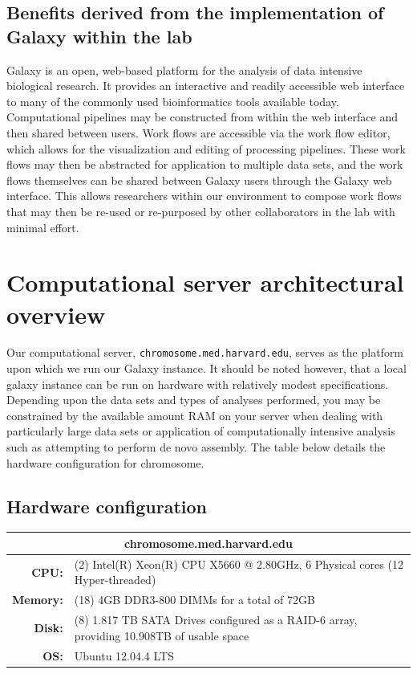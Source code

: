 \documentclass[a4paper,10pt]{article}
\begin{document}
\subsection{Benefits derived from the implementation of Galaxy within the lab}
Galaxy is an open, web-based platform for the analysis of data intensive biological research.  It provides an interactive and readily accessible web interface to many of the commonly used bioinformatics tools available today.  Computational pipelines may be constructed from within the web interface and then shared between users.  Work flows are accessible via the work flow editor, which allows for the visualization and editing of processing pipelines.  These work flows may then be abstracted for application to multiple data sets, and the work flows themselves can be shared between Galaxy users through the Galaxy web interface.  This allows researchers within our environment to compose work flows that may then be re-used or re-purposed by other collaborators in the lab with minimal effort.

\section{Computational server architectural overview}
Our computational server, \texttt{\footnotesize{chromosome.med.harvard.edu}}, serves as the platform upon which we run our Galaxy instance.  It should be noted however, that a local galaxy instance can be run on hardware with relatively modest specifications.  Depending upon the data sets and types of analyses performed, you may be constrained by the available amount RAM on your server when dealing with particularly large data sets or application of computationally intensive analysis such as attempting to perform de novo assembly.  The table below details the hardware configuration for chromosome.

\subsection{Hardware configuration}
\renewcommand{\arraystretch}{1.5}
\begin{tabular}{|r|p{.8\linewidth}|}
\hline
\multicolumn{2}{|c|}{\textbf{chromosome.med.harvard.edu}}\\
\hline
\textbf{CPU:} & (2) Intel(R) Xeon(R) CPU  X5660  @ 2.80GHz, 6 Physical cores (12 Hyper-threaded)\\
\hline
\textbf{Memory:} & (18) 4GB DDR3-800 DIMMs for a total of 72GB\\
\hline
\textbf{Disk:} & (8) 1.817 TB SATA Drives configured as a RAID-6 array, providing 10.908TB of usable space\\
\hline
\textbf{OS:} & Ubuntu 12.04.4 LTS\\
\hline
\end{tabular}
\end{document}

